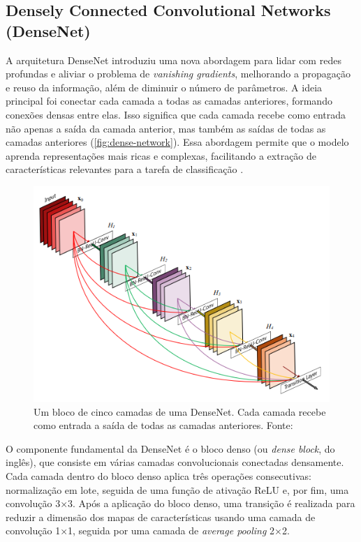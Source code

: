 \subsection{Densely Connected Convolutional Networks (DenseNet)}

A arquitetura DenseNet introduziu uma nova abordagem para lidar com redes profundas e aliviar o problema de \textit{vanishing gradients}, melhorando a propagação e reuso da informação, além de diminuir o número de parâmetros. A ideia principal foi conectar cada camada a todas as camadas anteriores, formando conexões densas entre elas. Isso significa que cada camada recebe como entrada não apenas a saída da camada anterior, mas também as saídas de todas as camadas anteriores (\autoref{fig:dense-network}). Essa abordagem permite que o modelo aprenda representações mais ricas e complexas, facilitando a extração de características relevantes para a tarefa de classificação \cite{Huang2017}.

\begin{figure}[!htbp]
    \centering
    \includegraphics[width=0.7\linewidth]{figs/dense-network.png}
    \caption{Um bloco de cinco camadas de uma DenseNet. Cada camada recebe como entrada a saída de todas as camadas anteriores. Fonte: }
    \label{fig:dense-network}
\end{figure}

O componente fundamental da DenseNet é o bloco denso (ou \textit{dense block}, do inglês), que consiste em várias camadas convolucionais conectadas densamente. Cada camada dentro do bloco denso aplica três operações consecutivas: normalização em lote, seguida de uma função de ativação ReLU e, por fim, uma convolução 3×3. Após a aplicação do bloco denso, uma transição é realizada para reduzir a dimensão dos mapas de características usando uma camada de convolução 1×1, seguida por uma camada de \textit{average pooling} 2×2.

